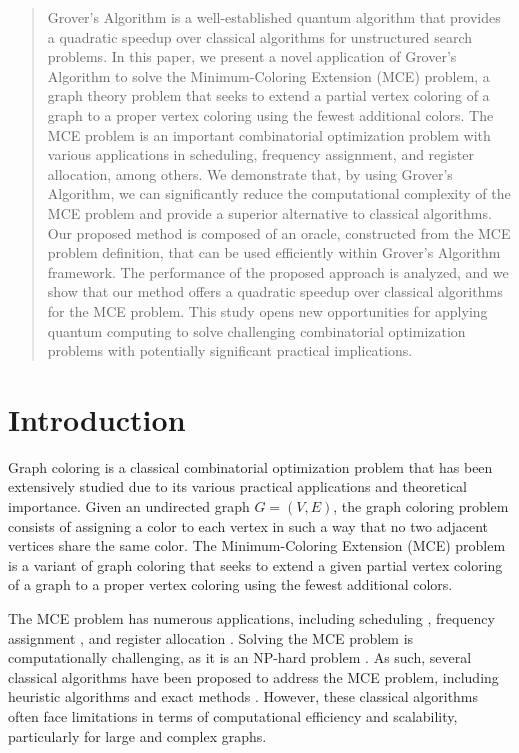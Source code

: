 \begin{abstract}
Grover's Algorithm is a well-established quantum algorithm that provides a quadratic speedup over classical algorithms for unstructured search problems. In this paper, we present a novel application of Grover's Algorithm to solve the Minimum-Coloring Extension (MCE) problem, a graph theory problem that seeks to extend a partial vertex coloring of a graph to a proper vertex coloring using the fewest additional colors. The MCE problem is an important combinatorial optimization problem with various applications in scheduling, frequency assignment, and register allocation, among others. We demonstrate that, by using Grover's Algorithm, we can significantly reduce the computational complexity of the MCE problem and provide a superior alternative to classical algorithms. Our proposed method is composed of an oracle, constructed from the MCE problem definition, that can be used efficiently within Grover's Algorithm framework. The performance of the proposed approach is analyzed, and we show that our method offers a quadratic speedup over classical algorithms for the MCE problem. This study opens new opportunities for applying quantum computing to solve challenging combinatorial optimization problems with potentially significant practical implications.

\end{abstract}

\section{Introduction}
\label{sec:introduction}

Graph coloring is a classical combinatorial optimization problem that has been extensively studied due to its various practical applications and theoretical importance. Given an undirected graph $G = (V, E)$, the graph coloring problem consists of assigning a color to each vertex in such a way that no two adjacent vertices share the same color. The Minimum-Coloring Extension (MCE) problem is a variant of graph coloring that seeks to extend a given partial vertex coloring of a graph to a proper vertex coloring using the fewest additional colors.

The MCE problem has numerous applications, including scheduling \cite{MCE_scheduling}, frequency assignment \cite{MCE_frequency}, and register allocation \cite{MCE_register}. Solving the MCE problem is computationally challenging, as it is an NP-hard problem \cite{MCE_np_hard}. As such, several classical algorithms have been proposed to address the MCE problem, including heuristic algorithms and exact methods \cite{MCE_methods}. However, these classical algorithms often face limitations in terms of computational efficiency and scalability, particularly for large and complex graphs.

